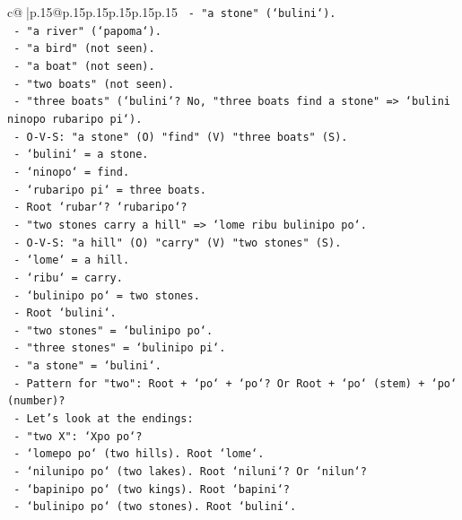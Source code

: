 \documentclass{article}
\begin{document}
{\begin{supertabular}{c@{$\;$}|p{.15\linewidth}@{}p{.15\linewidth}p{.15\linewidth}p{.15\linewidth}p{.15\linewidth}p{.15\linewidth}}
{{{\texttt{        {-} "a stone" (`bulini`).} \\
\texttt{        {-} "a river" (`papoma`).} \\
\texttt{        {-} "a bird" (not seen).} \\
\texttt{        {-} "a boat" (not seen).} \\
\texttt{        {-} "two boats" (not seen).} \\
\texttt{        {-} "three boats" (`bulini`? No, "three boats find a stone" => `bulini ninopo rubaripo pi`).} \\
\texttt{          {-} O{-}V{-}S: "a stone" (O) "find" (V) "three boats" (S).} \\
\texttt{          {-} `bulini` = a stone.} \\
\texttt{          {-} `ninopo` = find.} \\
\texttt{          {-} `rubaripo pi` = three boats.} \\
\texttt{          {-} Root `rubar`? `rubaripo`?} \\
\texttt{        {-} "two stones carry a hill" => `lome ribu bulinipo po`.} \\
\texttt{          {-} O{-}V{-}S: "a hill" (O) "carry" (V) "two stones" (S).} \\
\texttt{          {-} `lome` = a hill.} \\
\texttt{          {-} `ribu` = carry.} \\
\texttt{          {-} `bulinipo po` = two stones.} \\
\texttt{          {-} Root `bulini`.} \\
\texttt{          {-} "two stones" = `bulinipo po`.} \\
\texttt{          {-} "three stones" = `bulinipo pi`.} \\
\texttt{          {-} "a stone" = `bulini`.} \\
\texttt{          {-} Pattern for "two": Root + `po` + `po`? Or Root + `po` (stem) + `po` (number)?} \\
\texttt{          {-} Let's look at the endings:} \\
\texttt{            {-} "two X": `Xpo po`?} \\
\texttt{              {-} `lomepo po` (two hills). Root `lome`.} \\
\texttt{              {-} `nilunipo po` (two lakes). Root `niluni`? Or `nilun`?} \\
\texttt{              {-} `bapinipo po` (two kings). Root `bapini`?} \\
\texttt{              {-} `bulinipo po` (two stones). Root `bulini`.} \\
}}}
\end{supertabular}}
\end{document}
